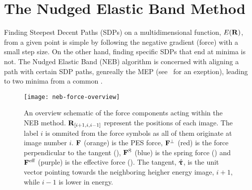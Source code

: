 \section{The Nudged Elastic Band Method}
\label{sec:neb}


Finding Steepest Decent Paths (SDPs) on a multidimensional function, $E({\mathrm{\mathbf{\bm{R}}}})$, from a given point is simple by following the negative gradient (force) with a small step size.
On the other hand, finding specific SDPs that end at minima is not.
The Nudged Elastic Band (NEB) algorithm is concerned with aligning a path with certain SDP paths, genreally the MEP (see~\cite{neb-polemic-henkelman1} for an exeption), leading to two minima from a common .

\begin{figure}[t]
  \begin{center}
    \texttt{[image: neb-force-overview]}
\parbox{0.85\linewidth}{\caption{An overview schematic of the force components acting within the NEB method.
${\mathrm{\mathbf{\bm{R}}}}_{[i+1, i, i-1]}$ represent the positions of each image.
The label $i$ is ommited from the force symbols as all of them originate at image number $i$.
${\mathrm{\mathbf{\bm{F}}}}$ (orange) is the PES force,
${\mathrm{\mathbf{\bm{F}}}}^\perp$ (red) is the force perpendicular to the tangent (),
${\mathrm{\mathbf{\bm{F}}}}^\text{S}$ (blue) is the spring force () and
${\mathrm{\mathbf{\bm{F}}}}^\text{eff}$ (purple) is the effective force ().
The tangent, $\hat{{\mathrm{\mathbf{\bm{\uptau}}}}}$, is the unit vector pointing towards the neighboring heigher energy image, $i+1$, while $i-1$ is lower in energy.
}
\label{fig:neb-force-overview}
}
  \end{center}
\end{figure}

